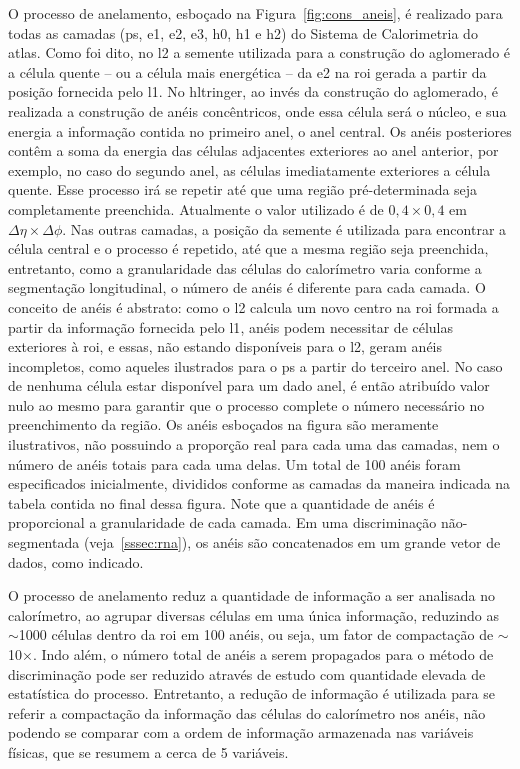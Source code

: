 O processo de anelamento, esboçado na Figura~\ref{fig:cons_aneis}, é realizado
para todas as camadas (\gls{ps}, \gls{e1}, \gls{e2}, \gls{e3}, \gls{h0},
\gls{h1} e \gls{h2}) do Sistema de Calorimetria do \gls{atlas}. Como foi dito,
no \gls{l2} a semente utilizada para a construção do aglomerado é a célula quente  -- ou a célula mais
energética -- da \gls{e2} na \gls{roi} gerada a partir da posição 
fornecida pelo \gls{l1}. No \gls{hltringer}, ao invés da construção do
aglomerado, é realizada a construção de anéis concêntricos, onde essa célula
será o núcleo, e sua energia a informação contida no primeiro anel, o anel central. 
Os anéis posteriores contêm a soma da energia das células adjacentes
exteriores ao anel anterior, por exemplo, no caso do segundo anel, as células imediatamente
exteriores a célula quente. Esse processo irá se repetir até que uma região pré-determinada seja
completamente preenchida. Atualmente o valor utilizado é de $0,4\times0,4$ em
$\Delta\eta\times\Delta\phi$. Nas outras camadas, a posição da
semente é utilizada para encontrar a célula central e o processo é repetido, até
que a mesma região seja preenchida, entretanto, como a granularidade das células
do calorímetro varia conforme a segmentação longitudinal, o número de anéis é diferente
para cada camada. O conceito de anéis é abstrato: como o \gls{l2} calcula
um novo centro na \gls{roi} formada a partir da informação fornecida pelo
\gls{l1}, anéis podem necessitar de células exteriores à \gls{roi},
e essas, não estando disponíveis para o \gls{l2}, geram anéis incompletos,
como aqueles ilustrados para o \gls{ps} a partir do terceiro anel. 
No caso de nenhuma célula estar disponível para um dado anel, é então atribuído valor
nulo ao mesmo para garantir que o processo complete o número necessário no
preenchimento da região. Os anéis esboçados na figura são meramente
ilustrativos, não possuindo a proporção real para cada uma das camadas, nem o
número de anéis totais para cada uma delas. Um total de 100 anéis foram 
especificados inicialmente, divididos conforme as camadas da maneira indicada na
tabela contida no final dessa figura. Note que a quantidade de anéis é proporcional 
a granularidade de cada camada. Em uma discriminação não-segmentada
(veja~\ref{sssec:rna}), os anéis são concatenados em um grande vetor de dados,
como indicado.

O processo de anelamento reduz a quantidade de informação a ser analisada no
calorímetro, ao agrupar diversas células em uma única informação, reduzindo
as $\sim$1000 células dentro da \gls{roi} em 100 anéis, ou seja, um fator de
compactação de $\sim$10$\times$. Indo além, o número total de anéis a serem
propagados para o método de discriminação pode ser reduzido através de estudo
com quantidade elevada de estatística do processo. Entretanto, a redução de informação 
é utilizada para se referir a compactação da
informação das células do calorímetro nos anéis, não podendo se comparar 
com a ordem de informação armazenada nas variáveis físicas, 
que se resumem a cerca de 5 variáveis.

